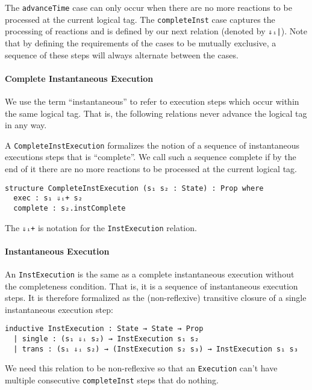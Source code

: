 The \lstinline{advanceTime} case can only occur when there are no more reactions to be processed at the current logical tag.
The \lstinline{completeInst} case captures the processing of reactions and is defined by our next relation (denoted by \lstinline{⇓ᵢ|}).
Note that by defining the requirements of the cases to be mutually exclusive, a sequence of these steps will always alternate between the cases.

\paragraph{Complete Instantaneous Execution}

We use the term ``instantaneous'' to refer to execution steps which occur within the same logical tag.
That is, the following relations never advance the logical tag in any way.

A \lstinline{CompleteInstExecution} formalizes the notion of a sequence of instantaneous executions steps that is ``complete''.
We call such a sequence complete if by the end of it there are no more reactions to be processed at the current logical tag.

\begin{lstlisting}
structure CompleteInstExecution (s₁ s₂ : State) : Prop where
  exec : s₁ ⇓ᵢ+ s₂
  complete : s₂.instComplete
\end{lstlisting}

The \lstinline{⇓ᵢ+} is notation for the \lstinline{InstExecution} relation.

\paragraph{Instantaneous Execution}

An \lstinline{InstExecution} is the same as a complete instantaneous execution without the completeness condition.
That is, it is a sequence of instantaneous execution steps.
It is therefore formalized as the (non-reflexive) transitive closure of a single instantaneous execution step:

\begin{lstlisting}
inductive InstExecution : State → State → Prop 
  | single : (s₁ ⇓ᵢ s₂) → InstExecution s₁ s₂
  | trans : (s₁ ⇓ᵢ s₂) → (InstExecution s₂ s₃) → InstExecution s₁ s₃
\end{lstlisting}

We need this relation to be non-reflexive so that an \lstinline{Execution} can't have multiple consecutive \lstinline{completeInst} steps that do nothing.


